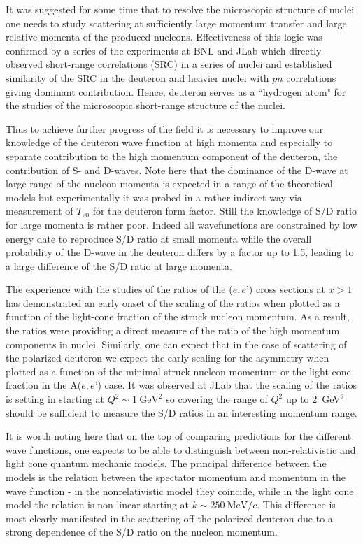 It was suggested for some time that to resolve the microscopic structure  of nuclei one needs to study scattering at sufficiently large momentum transfer and large relative momenta of the produced nucleons. Effectiveness of this logic was confirmed by a series of the experiments at BNL and JLab which directly observed  short-range correlations (SRC) in a series of nuclei and established similarity of the SRC in the deuteron and heavier nuclei with $pn$ correlations giving dominant contribution.  Hence, deuteron serves as a ``hydrogen atom" for the studies of the microscopic short-range structure  of the nuclei.

Thus to achieve further progress of the field it is necessary to improve our knowledge of the deuteron wave function at high momenta and especially to separate contribution to the high momentum component of the deuteron, the contribution of S- and D-waves. Note here that the dominance of the D-wave at large range of the nucleon momenta is expected in a range of the theoretical models but experimentally it was probed in a rather indirect way via measurement of $T_{20}$ for the deuteron form factor. Still the knowledge of S/D ratio for large momenta is rather poor. Indeed all wavefunctions are constrained by low energy date to reproduce S/D ratio at small momenta while the overall probability of the D-wave in the deuteron differs by a factor up to 1.5, leading to a large difference of the S/D ratio at large momenta.

The experience with the studies of the ratios of the ($e,e’$) cross sections at $x>1$ has demonstrated an early onset of the scaling of the ratios when plotted as a function of the light-cone fraction of the struck nucleon momentum.  As a result, the ratios were providing a direct measure of the ratio of the high momentum components in nuclei.  Similarly, one can expect that in the case of scattering of the polarized deuteron we expect the early scaling for the asymmetry when plotted as a function of the minimal struck nucleon momentum or the light cone fraction in the A($e,e’$) case.
It was observed at JLab that the scaling of the ratios is setting in starting at $Q^2 \sim 1 \mathrm{~GeV}^2$ so covering the range of $Q^2$ up to 2~GeV$^2$ should be sufficient to  measure the S/D ratios in an interesting momentum range.

It is worth noting here that on the top of comparing predictions for the different wave functions, one expects to be able to distinguish between non-relativistic and light cone quantum mechanic models.  The principal difference between the models is the relation between the spectator momentum and momentum in the wave function - in the nonrelativistic model they coincide, while in the light cone model the relation is non-linear starting at $k \sim 250 \mathrm{~MeV}/c$. This difference is most clearly manifested in the scattering off the polarized deuteron due to a strong dependence of the S/D ratio on the nucleon momentum.